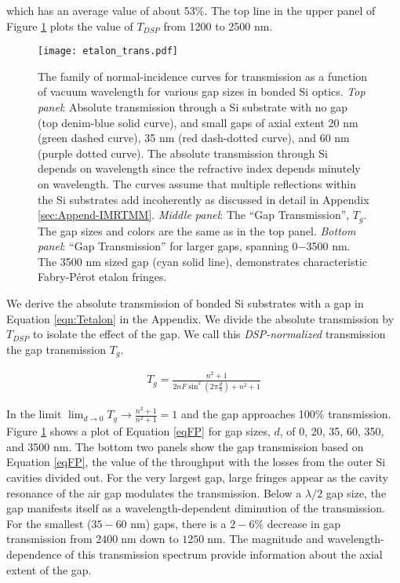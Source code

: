 \documentclass[osajnl,twocolumn,showpacs,superscriptaddress,11pt]{revtex4-1} %
\begin{document}
which has an average value of about 53\%.  The top line in the upper panel of Figure \ref{figAbsoluteTrans} plots the value of $T_{DSP}$ from 1200 to 2500 nm.

\begin{figure}[!htbp]
\texttt{[image: etalon\_trans.pdf]}
\caption{\label{figAbsoluteTrans}The family of normal-incidence curves for transmission as a function of vacuum wavelength for various gap sizes in bonded Si optics.  \emph{Top panel}: Absolute transmission through a Si substrate with no gap (top denim-blue solid curve), and small gaps of axial extent 20 nm (green dashed curve), 35 nm (red dash-dotted curve), and 60 nm (purple dotted curve).  The absolute transmission through Si depends on wavelength since the refractive index depends minutely on wavelength.  The curves assume that multiple reflections within the Si substrates add incoherently as discussed in detail in Appendix \ref{sec:Append-IMRTMM}.  \emph{Middle panel}: The ``Gap Transmission'', $T_g$. The gap sizes and colors are the same as in the top panel.  \emph{Bottom panel}: ``Gap Transmission'' for larger gaps, spanning 0$-$3500 nm.  The 3500 nm sized gap (cyan solid line), demonstrates characteristic Fabry-P\'{e}rot etalon fringes.}
\end{figure}

We derive the absolute transmission of bonded Si substrates with a gap in Equation \ref{eqn:Tetalon} in the Appendix.  We divide the absolute transmission by $T_{DSP}$ to isolate the effect of the gap.  We call this \emph{DSP-normalized} transmission the gap transmission $T_{g}$.

\begin{eqnarray}
T_{g} = \frac{n^2+1}{2 n F \sin ^2(2\pi \frac{d}{\lambda})+n^2+1} \label{eqFP}
\end{eqnarray}

In the limit $\lim_{d \to 0} T_g \rightarrow \frac{n^2 + 1}{n^2 + 1} = 1 $ and the gap approaches 100\% transmission.  Figure \ref{figAbsoluteTrans} shows a plot of Equation \ref{eqFP} for gap sizes, $d$, of 0, 20, 35, 60, 350, and 3500 nm.  The bottom two panels show the gap transmission based on Equation \ref{eqFP}, the value of the throughput with the losses from the outer Si cavities divided out.  For the very largest gap, large fringes appear as the cavity resonance of the air gap modulates the transmission.  Below a $\lambda/2$ gap size, the gap manifests itself as a wavelength-dependent diminution of the transmission.  For the smallest ($35-60$ nm) gaps, there is a $2-6\%$ decrease in gap transmission from $2400\;$nm down to $1250\;$nm.  The magnitude and wavelength-dependence of this transmission spectrum provide information about the axial extent of the gap.
\end{document}
